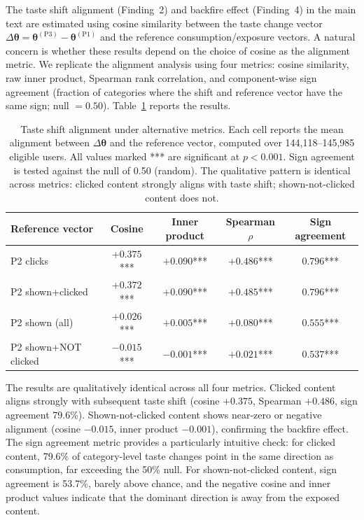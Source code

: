 \documentclass[11pt]{article}
\begin{document}
The taste shift alignment (Finding~2) and backfire effect (Finding~4) in the main text are estimated using cosine similarity between the taste change vector $\Delta\boldsymbol{\theta} = \boldsymbol{\theta}^{(\text{P3})} - \boldsymbol{\theta}^{(\text{P1})}$ and the reference consumption/exposure vectors. A natural concern is whether these results depend on the choice of cosine as the alignment metric. We replicate the alignment analysis using four metrics: cosine similarity, raw inner product, Spearman rank correlation, and component-wise sign agreement (fraction of categories where the shift and reference vector have the same sign; null $= 0.50$). Table~\ref{tab:metric_robust} reports the results.

\begin{table}[ht]
\centering
\caption{Taste shift alignment under alternative metrics. Each cell reports the mean alignment between $\Delta\boldsymbol{\theta}$ and the reference vector, computed over 144,118--145,985 eligible users. All values marked *** are significant at $p < 0.001$. Sign agreement is tested against the null of 0.50 (random). The qualitative pattern is identical across metrics: clicked content strongly aligns with taste shift; shown-not-clicked content does not.}
\label{tab:metric_robust}
\begin{tabular}{lcccc}
\toprule
Reference vector & Cosine & Inner product & Spearman $\rho$ & Sign agreement \\
\midrule
P2 clicks & $+0.375$*** & $+0.090$*** & $+0.486$*** & $0.796$*** \\
P2 shown+clicked & $+0.372$*** & $+0.090$*** & $+0.485$*** & $0.796$*** \\
P2 shown (all) & $+0.026$*** & $+0.005$*** & $+0.080$*** & $0.555$*** \\
P2 shown+NOT clicked & $-0.015$*** & $-0.001$*** & $+0.021$*** & $0.537$*** \\
\bottomrule
\end{tabular}
\end{table}
\FloatBarrier

The results are qualitatively identical across all four metrics. Clicked content aligns strongly with subsequent taste shift (cosine $+0.375$, Spearman $+0.486$, sign agreement 79.6\%). Shown-not-clicked content shows near-zero or negative alignment (cosine $-0.015$, inner product $-0.001$), confirming the backfire effect. The sign agreement metric provides a particularly intuitive check: for clicked content, 79.6\% of category-level taste changes point in the same direction as consumption, far exceeding the 50\% null. For shown-not-clicked content, sign agreement is 53.7\%, barely above chance, and the negative cosine and inner product values indicate that the dominant direction is away from the exposed content.
\end{document}
